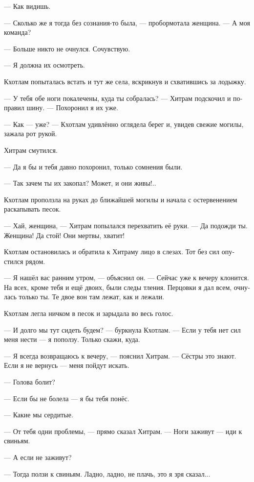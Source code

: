 \documentclass[a4paper,12pt,fleqn]{book}\usepackage{cooltooltips}\usepackage{polyglossia}\setdefaultlanguage{russian}\setotherlanguage{english}\defaultfontfeatures{Ligatures=TeX,Mapping=tex-text} \usepackage{xcolor}\definecolor{lightgray}{HTML}{bbbbbb}\color{lightgray}\newcommand{\ml}[3]{\textenglish{\textcolor{black}{#3}}}
\newcommand{\asterism}{\vspace{1em}{\centering\Large\bfseries$\ast~\ast~\ast$\par}\vspace{1em}}
\begin{document}
--- Как видишь.

--- Сколько же я тогда без сознания-то была, --- пробормотала женщина.
--- А моя команда?

--- Больше никто не очнулся.
Сочувствую.

--- Я должна их осмотреть.

Кхотлам попыталась встать и тут же села, вскрикнув и схватившись за лодыжку.

--- У тебя обе ноги покалечены, куда ты собралась? --- Хитрам подскочил и поправил шину.
--- Похоронил я их уже.

--- Как --- уже? --- Кхотлам удивлённо оглядела берег и, увидев свежие могилы, зажала рот рукой.

Хитрам смутился.

--- Да я бы и тебя давно похоронил, только сомнения были.

--- Так зачем ты их закопал?
Может, и они живы!..

Кхотлам проползла на руках до ближайшей могилы и начала с остервенением раскапывать песок.

--- Хай, женщина, --- Хитрам попылался перехватить её руки.
--- Да подожди ты.
Женщина!
Да стой!
Они мертвы, хватит!

Кхотлам остановилась и обратила к Хитраму лицо в слезах.
Тот без сил опустился рядом.

--- Я нашёл вас ранним утром, --- объяснил он.
--- Сейчас уже к вечеру клонится.
На всех, кроме тебя и ещё двоих, были следы тления.
Перцовки я дал всем, очнулась только ты.
Те двое вон там лежат, как и лежали.

Кхотлам легла ничком в песок и зарыдала во весь голос.

\asterism

--- И долго мы тут сидеть будем? --- буркнула Кхотлам.
--- Если у тебя нет сил меня нести --- я поползу.
Только скажи, куда.

--- Я всегда возвращаюсь к вечеру, --- пояснил Хитрам.
--- Сёстры это знают.
Если я не вернусь --- меня пойдут искать.

--- Голова болит?

--- Если бы не болела --- я бы тебя понёс.

--- Какие мы сердитые.

--- От тебя одни проблемы, --- прямо сказал Хитрам.
--- Ноги заживут --- иди к свиньям.

--- А если не заживут?

--- Тогда ползи к свиньям.
Ладно, ладно, не плачь, это я зря сказал...
\end{document}
